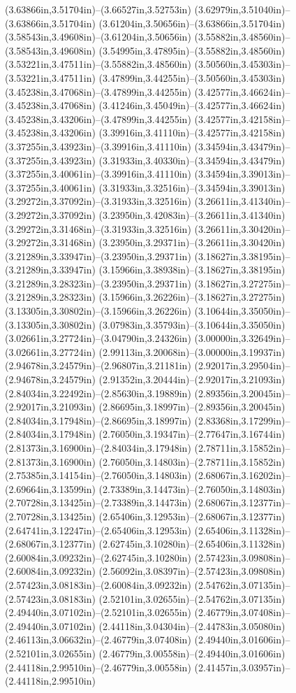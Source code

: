 (3.63866in,3.51704in)--(3.66527in,3.52753in) (3.62979in,3.51040in)--(3.63866in,3.51704in) (3.61204in,3.50656in)--(3.63866in,3.51704in) (3.58543in,3.49608in)--(3.61204in,3.50656in) (3.55882in,3.48560in)--(3.58543in,3.49608in) (3.54995in,3.47895in)--(3.55882in,3.48560in) (3.53221in,3.47511in)--(3.55882in,3.48560in) (3.50560in,3.45303in)--(3.53221in,3.47511in) (3.47899in,3.44255in)--(3.50560in,3.45303in) (3.45238in,3.47068in)--(3.47899in,3.44255in) (3.42577in,3.46624in)--(3.45238in,3.47068in) (3.41246in,3.45049in)--(3.42577in,3.46624in) (3.45238in,3.43206in)--(3.47899in,3.44255in) (3.42577in,3.42158in)--(3.45238in,3.43206in) (3.39916in,3.41110in)--(3.42577in,3.42158in) (3.37255in,3.43923in)--(3.39916in,3.41110in) (3.34594in,3.43479in)--(3.37255in,3.43923in) (3.31933in,3.40330in)--(3.34594in,3.43479in) (3.37255in,3.40061in)--(3.39916in,3.41110in) (3.34594in,3.39013in)--(3.37255in,3.40061in) (3.31933in,3.32516in)--(3.34594in,3.39013in) (3.29272in,3.37092in)--(3.31933in,3.32516in) (3.26611in,3.41340in)--(3.29272in,3.37092in) (3.23950in,3.42083in)--(3.26611in,3.41340in) (3.29272in,3.31468in)--(3.31933in,3.32516in) (3.26611in,3.30420in)--(3.29272in,3.31468in) (3.23950in,3.29371in)--(3.26611in,3.30420in) (3.21289in,3.33947in)--(3.23950in,3.29371in) (3.18627in,3.38195in)--(3.21289in,3.33947in) (3.15966in,3.38938in)--(3.18627in,3.38195in) (3.21289in,3.28323in)--(3.23950in,3.29371in) (3.18627in,3.27275in)--(3.21289in,3.28323in) (3.15966in,3.26226in)--(3.18627in,3.27275in) (3.13305in,3.30802in)--(3.15966in,3.26226in) (3.10644in,3.35050in)--(3.13305in,3.30802in) (3.07983in,3.35793in)--(3.10644in,3.35050in) (3.02661in,3.27724in)--(3.04790in,3.24326in) (3.00000in,3.32649in)--(3.02661in,3.27724in) (2.99113in,3.20068in)--(3.00000in,3.19937in) (2.94678in,3.24579in)--(2.96807in,3.21181in) (2.92017in,3.29504in)--(2.94678in,3.24579in) (2.91352in,3.20444in)--(2.92017in,3.21093in) (2.84034in,3.22492in)--(2.85630in,3.19889in) (2.89356in,3.20045in)--(2.92017in,3.21093in) (2.86695in,3.18997in)--(2.89356in,3.20045in) (2.84034in,3.17948in)--(2.86695in,3.18997in) (2.83368in,3.17299in)--(2.84034in,3.17948in) (2.76050in,3.19347in)--(2.77647in,3.16744in) (2.81373in,3.16900in)--(2.84034in,3.17948in) (2.78711in,3.15852in)--(2.81373in,3.16900in) (2.76050in,3.14803in)--(2.78711in,3.15852in) (2.75385in,3.14154in)--(2.76050in,3.14803in) (2.68067in,3.16202in)--(2.69664in,3.13599in) (2.73389in,3.14473in)--(2.76050in,3.14803in) (2.70728in,3.13425in)--(2.73389in,3.14473in) (2.68067in,3.12377in)--(2.70728in,3.13425in) (2.65406in,3.12953in)--(2.68067in,3.12377in) (2.64741in,3.12247in)--(2.65406in,3.12953in) (2.65406in,3.11328in)--(2.68067in,3.12377in) (2.62745in,3.10280in)--(2.65406in,3.11328in) (2.60084in,3.09232in)--(2.62745in,3.10280in) (2.57423in,3.09808in)--(2.60084in,3.09232in) (2.56092in,3.08397in)--(2.57423in,3.09808in) (2.57423in,3.08183in)--(2.60084in,3.09232in) (2.54762in,3.07135in)--(2.57423in,3.08183in) (2.52101in,3.02655in)--(2.54762in,3.07135in) (2.49440in,3.07102in)--(2.52101in,3.02655in) (2.46779in,3.07408in)--(2.49440in,3.07102in) (2.44118in,3.04304in)--(2.44783in,3.05080in) (2.46113in,3.06632in)--(2.46779in,3.07408in) (2.49440in,3.01606in)--(2.52101in,3.02655in) (2.46779in,3.00558in)--(2.49440in,3.01606in) (2.44118in,2.99510in)--(2.46779in,3.00558in) (2.41457in,3.03957in)--(2.44118in,2.99510in) 